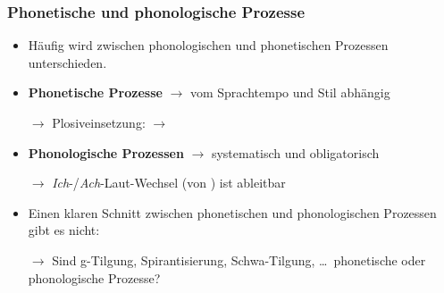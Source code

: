 \begin{frame}%
\frametitle{Phonetische und phonologische Prozesse}

\begin{itemize}
	\item Häufig wird zwischen phonologischen und phonetischen Prozessen unterschieden.
	\item[]
	\item \textbf{Phonetische Prozesse} $\rightarrow$ vom Sprachtempo und Stil abhängig
	\item[$\rightarrow$] Plosiveinsetzung:  $\rightarrow$ \textipa{[Pampt]}

	\item \textbf{Phonologische Prozessen} $\rightarrow$ systematisch und obligatorisch
	\item[$\rightarrow$] \textit{Ich}-/\textit{Ach}-Laut-Wechsel \textipa{[bu:x]} (von ) ist ableitbar
	\item[]
	\item Einen klaren Schnitt zwischen phonetischen und phonologischen Prozessen gibt es nicht:
	\item[$\rightarrow$] Sind g-Tilgung, Spirantisierung, Schwa-Tilgung, \dots\ phonetische oder phonologische Prozesse?
\end{itemize}

\end{frame}




